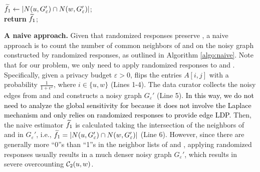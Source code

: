\begin{algorithm}[tbh]
    \small
	\caption{\naive}
	\label{algo:naive}
	\LinesNumbered
        
        $\widetilde{f}_1 \gets |N(u, G_{\varepsilon}') \cap N(w, G_{\varepsilon}')|$;\\
        \textbf{return} $\widetilde{f}_1$;\\
\end{algorithm}


\noindent
{\bf A naive approach.} 
Given that randomized responses preserve \epldp, a naive approach is to count the number of common neighbors of \vq and \vx on the noisy graph constructed by randomized responses, as outlined in Algorithm \ref{algo:naive}. 
Note that for our problem, we only need to apply randomized responses to \vq and \vx. 
Specifically, given a privacy budget $\varepsilon>0$, \naive flips the entries $A[i,j]$ with a probability $\frac{1}{1+e^{\varepsilon}}$, where $i \in \{u, w\}$ (Lines 1-4). 
The data curator collects the noisy edges from \vq and \vx and constructs a noisy graph $G_{\varepsilon}'$ (Line 5). 
\textcolor{black}{In this way, we do not need to analyze the global sensitivity for \naive because it does not involve the Laplace mechanism and only relies on randomized responses to provide edge LDP. }
Then, the naive estimator $\widetilde{f}_1$ is calculated taking the intersection of the neighbors of \vq and \vx in $G_{\varepsilon}'$, i.e., $\widetilde{f}_1 = |N(u, G_{\varepsilon}') \cap N(w, G_{\varepsilon}')|$ (Line 6). 
However, since there are generally more ``0''s than ``1''s in the neighbor lists of \vq and \vx, applying randomized responses usually results in a much denser noisy graph $G_{\varepsilon}'$, which results in severe overcounting $\mathcal{C}_2(u,w)$. 

